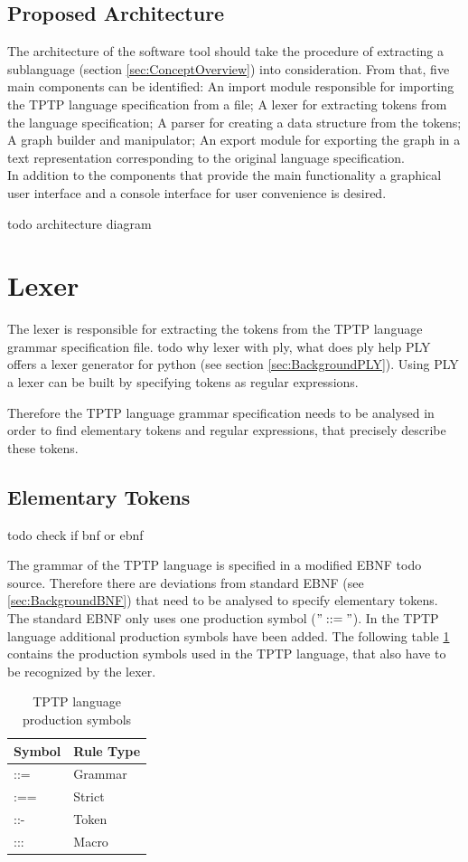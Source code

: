 \subsection{Proposed Architecture}\label{sec:ConceptProposedArchitecture}
The architecture of the software tool should take the procedure of extracting a sublanguage (section \ref{sec:ConceptOverview}) into consideration.
From that, five main components can be identified:
An import module responsible for importing the \ac{TPTP} language specification from a file;
A lexer for extracting tokens from the language specification; A parser for creating a data structure from the tokens;
A graph builder and manipulator;
An export module for exporting the graph in a text representation corresponding to the original language specification.\\
In addition to the components that provide the main functionality a graphical user interface and a console interface for user convenience is desired.

todo architecture diagram

\section{Lexer}\label{sec:ConceptLexer}
The lexer is responsible for extracting the tokens from the \ac{TPTP} language grammar specification file.
todo why lexer with ply, what does ply help
\ac{PLY} offers a lexer generator for python (see section \ref{sec:BackgroundPLY}).
Using \ac{PLY} a lexer can be built by specifying tokens as regular expressions.

Therefore the \ac{TPTP} language grammar specification needs to be analysed in order to find elementary tokens and regular expressions, that precisely describe these tokens.
\subsection{Elementary Tokens}\label{sec:ConceptElementaryTokens}
todo check if bnf or ebnf

The grammar of the \ac{TPTP} language is specified in a modified \ac{EBNF} todo source.
Therefore there are deviations from standard \ac{EBNF} (see \ref{sec:BackgroundBNF}) that need to be analysed to specify elementary tokens.
The standard \ac{EBNF} only uses one production symbol ($"::="$).
In the \ac{TPTP} language additional production symbols have been added.
The following table \ref{tbl:ConceptTPTPProductionSymbols} contains the production symbols used in the \ac{TPTP} language, that also have to be recognized by the lexer.
\begin{table}[H]
\centering
\renewcommand{\arraystretch}{1}
\caption{\ac{TPTP} language production symbols \cite{VS06}}
\begin{tabular}{ll}
\textbf{Symbol} & \textbf{Rule Type}\\\hline
::= & Grammar\\
:== & Strict\\
::- & Token\\
::: & Macro\\
\end{tabular}
\label{tbl:ConceptTPTPProductionSymbols}
\end{table}

